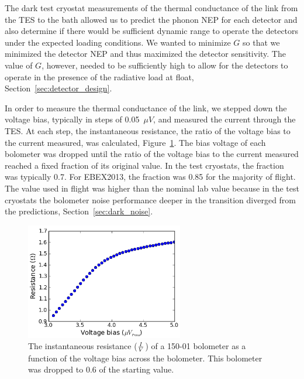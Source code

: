 The dark test cryostat measurements of the thermal conductance of the link from the \ac{TES} to the bath allowed us to predict the phonon \ac{NEP} for each detector and also determine if there would be sufficient dynamic range to operate the detectors under the expected loading conditions. 
We wanted to minimize $G$ so that we minimized the detector \ac{NEP} and thus maximized the detector sensitivity. 
The value of $G$, however, needed to be sufficiently high to allow for the detectors to operate in the presence of the radiative load at float, Section~\ref{sec:detector_design}. 

In order to measure the thermal conductance of the link, 
we stepped down the voltage bias, typically in steps of 0.05~$\mu V$, and measured the current through the \ac{TES}. 
At each step, the instantaneous resistance, the ratio of the voltage bias to the current measured, was calculated, Figure~\ref{fig:bolo_rv_curve}. 
The bias voltage of each bolometer was dropped until the ratio of the voltage bias to the current measured reached a fixed fraction of its original value.
In the test cryostats, the fraction was typically 0.7. 
For \ac{EBEX2013}, the fraction was 0.85 for the majority of flight.
The value used in flight was higher than the nominal lab value because in the test cryostats the bolometer noise performance deeper in the transition diverged from the predictions, Section~\ref{sec:dark_noise}. 

\begin{figure}[htbp]
\begin{center}
\includegraphics[height=2in]{figures/b53w0c0_RV.png} 
\caption{The instantaneous resistance ($I \over V$) of a 150-01 bolometer as a function of the voltage bias across the bolometer. This bolometer was dropped to 0.6 of the starting value. 
\label{fig:bolo_rv_curve} }
\end{center}
\end{figure}


